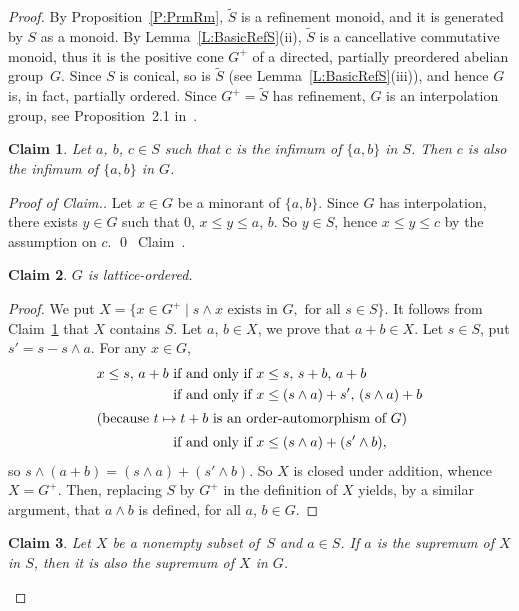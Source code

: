 \documentclass[psamsfonts,reqno]{memo-l}
\theoremstyle{plain}
\newtheorem{claim}{Claim}
\theoremstyle{definition}
\theoremstyle{remark}
\newcommand{\qedc}{{\qed}~{\rm Claim~{\theclaim}.}}
\newenvironment{cproof}
{\begin{proof}[Proof of Claim.]}
{\qedc\renewcommand{\qed}{}\end{proof}}
\numberwithin{equation}{section}
\renewcommand{\iff}{if and only if}
\newcommand{\Ref}[1]{\widetilde{#1}}
\newcommand{\cm}{commutative mon\-oid}
\newcommand{\set}[1]{\{#1\}}
\newcommand{\setm}[2]{\set{#1\mid#2}}
\begin{document}
\begin{proof}
By Proposition~\ref{P:PrmRm}, $\Ref S$ is a
 refinement monoid, and it is
generated by $S$ as a monoid. By Lemma~\ref{L:BasicRefS}(ii), $\Ref S$ is a
cancellative \cm, thus it is the positive cone $G^+$ of
a directed, partially preordered abelian group~$G$. Since $S$ is conical, so
is $\Ref S$ (see Lemma~\ref{L:BasicRefS}(iii)), and hence $G$ is, in fact,
partially ordered. Since $G^+=\Ref S$ has refinement,
$G$ is an interpolation group, see Proposition~2.1
in~\cite{Gpoag}.

\setcounter{claim}{0}
\begin{claim}\label{Cl:vwSG}
Let $a$, $b$, $c\in S$ such that $c$ is the infimum of $\set{a,b}$ in $S$.
Then $c$ is also the infimum of $\set{a,b}$ in $G$.
\end{claim}

\begin{cproof}
Let $x\in G$ be a minorant of $\set{a,b}$. Since $G$ has interpolation,
there exists $y\in G$ such that $0$, $x\leq y\leq a$, $b$. So $y\in S$,
hence $x\leq y\leq c$ by the assumption on $c$.
\end{cproof}

\begin{claim}\label{Cl:LatOrd}
$G$ is lattice-ordered.
\end{claim}

\begin{proof}
We put
$X=\setm{x\in G^+}{s\wedge x\text{ exists in }G,\text{ for all }s\in S}$.
It follows from Claim~\ref{Cl:vwSG} that $X$ contains $S$. Let $a$,
$b\in X$, we prove that $a+b\in X$. Let $s\in S$, put $s'=s-s\wedge a$. For
any $x\in G$,
   \begin{align*}
   x\leq s,\,a+b&\text{ \iff\ }x\leq s,\,s+b,\,a+b\\
   &\text{ \iff\ }x\leq(s\wedge a)+s',\,(s\wedge a)+b\\
\intertext{(because $t\mapsto t+b$ is an order-automorphism of $G$)}
   &\text{ \iff\ }x\leq(s\wedge a)+(s'\wedge b),
   \end{align*}
so $s\wedge(a+b)=(s\wedge a)+(s'\wedge b)$. So $X$ is closed under addition,
whence $X=G^+$. Then, replacing $S$ by $G^+$ in the definition of $X$
yields, by a similar argument, that $a\wedge b$ is defined, for all
$a$, $b\in G$.
\end{proof}

\begin{claim}\label{Cl:VWSG}
Let $X$ be a nonempty subset of~$S$ and $a\in S$. If $a$ is the supremum of
$X$ in $S$, then it is also the supremum of $X$ in $G$.
\end{claim}


\end{proof}
\end{document}
